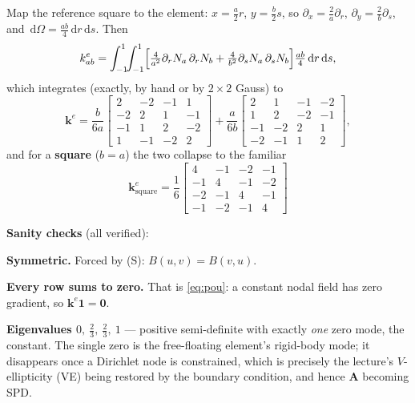 \documentclass[11pt]{article}
\newcommand{\dOm}{\,\mathrm{d}\Omega}
\begin{document}
Map the reference square to the element: $x=\tfrac{a}{2}r$,
$y=\tfrac{b}{2}s$, so $\partial_{x}=\tfrac2a\partial_{r}$,
$\partial_{y}=\tfrac2b\partial_{s}$, and $\dOm=\tfrac{ab}{4}\,\mathrm{d}r\,\mathrm{d}s$.
Then
\begin{equation}\label{eq:keint}
  k^{e}_{ab}=\int_{-1}^{1}\!\!\int_{-1}^{1}
   \Bigl[\tfrac{4}{a^{2}}\partial_{r}N_{a}\,\partial_{r}N_{b}
        +\tfrac{4}{b^{2}}\partial_{s}N_{a}\,\partial_{s}N_{b}\Bigr]
   \tfrac{ab}{4}\,\mathrm{d}r\,\mathrm{d}s ,
\end{equation}
which integrates (exactly, by hand or by $2\times2$ Gauss) to
\begin{equation}\label{eq:ke}
  \bm{k}^{e}=
  \frac{b}{6a}
  \begin{bmatrix}
     2&-2&-1& 1\\
    -2& 2& 1&-1\\
    -1& 1& 2&-2\\
     1&-1&-2& 2
  \end{bmatrix}
  +\frac{a}{6b}
  \begin{bmatrix}
     2& 1&-1&-2\\
     1& 2&-2&-1\\
    -1&-2& 2& 1\\
    -2&-1& 1& 2
  \end{bmatrix},
\end{equation}
and for a \textbf{square} ($b=a$) the two collapse to the familiar
\begin{equation}\label{eq:kesq}
  \boxed{\;
  \bm{k}^{e}_{\text{square}}=\frac{1}{6}
  \begin{bmatrix}
     4&-1&-2&-1\\
    -1& 4&-1&-2\\
    -2&-1& 4&-1\\
    -1&-2&-1& 4
  \end{bmatrix}\;}
\end{equation}

\medskip
\textbf{Sanity checks} (all verified):
\begin{steps}
\item \textbf{Symmetric.} Forced by (S): $B(u,v)=B(v,u)$.
\item \textbf{Every row sums to zero.} That is \eqref{eq:pou}: a constant nodal
      field has zero gradient, so $\bm{k}^{e}\bm{1}=\bm{0}$.
\item \textbf{Eigenvalues $0,\ \tfrac23,\ \tfrac23,\ 1$} --- positive
      semi-definite with exactly \emph{one} zero mode, the constant. The single
      zero is the free-floating element's rigid-body mode; it disappears once a
      Dirichlet node is constrained, which is precisely the lecture's
      $V$-ellipticity (VE) being restored by the boundary condition, and hence
      $\bm{A}$ becoming SPD.
\end{steps}
\end{document}
